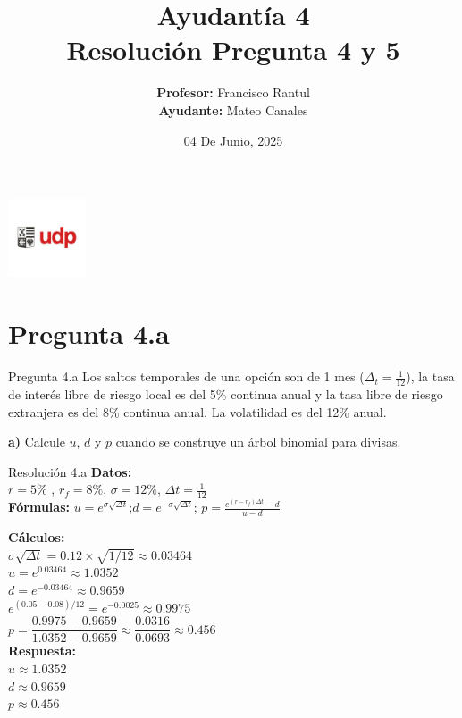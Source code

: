 \documentclass{beamer}
\title{Ayudantía 4 \\ Resolución Pregunta 4 y 5}
\author{
  \texorpdfstring{
    \textbf{Profesor:} Francisco Rantul \\[0.3em]
    \textbf{Ayudante:} Mateo Canales
  }{Profesor: Francisco Rantul, Ayudante: Mateo Canales}
}
\institute{Universidad Diego Portales}
\date{04 De Junio, 2025}
\begin{document}
\begin{frame}
    \titlepage
    \vfill
    \centering
    \includegraphics[width=2.3118cm]{../imagenes/logo.png}
\end{frame}

\section{Pregunta 4.a}
\begin{frame}{Pregunta 4.a}
  \justify
  Los saltos temporales de una opción son de 1 mes ($\Delta_t=\frac{1}{12}$), la tasa de interés libre de riesgo 
  local es del 5\% continua anual y la tasa libre de riesgo extranjera es del 8\% continua anual. 
  La volatilidad es del 12\% anual.

  \vspace{1em}
  \textbf{a)} Calcule $u$, $d$ y $p$ cuando se construye un árbol binomial para divisas.
\end{frame}

\begin{frame}{Resolución 4.a}
\justify
\textbf{Datos:} \\
$r=5\%$ , $r_f =8\%$, $\sigma=12\%$, $\Delta t = \frac{1}{12}$ \\

\vspace{0.5em}
\textbf{Fórmulas:}
$u = e^{\sigma \sqrt{\Delta t}}$;$d = e^{-\sigma \sqrt{\Delta t}}$; $p = \frac{e^{(r-r_f) \Delta t} - d}{u - d}$

\vspace{0.5em}
\textbf{Cálculos:} \\
$\sigma\sqrt{\Delta t} = 0.12 \times \sqrt{1/12} \approx 0.03464$ \\

$u = e^{0.03464} \approx 1.0352$ \\
$d = e^{-0.03464} \approx 0.9659$ \\

$e^{(0.05-0.08)/12} = e^{-0.0025} \approx 0.9975$ \\

$p = \dfrac{0.9975 - 0.9659}{1.0352 - 0.9659} \approx \dfrac{0.0316}{0.0693} \approx 0.456$ \\

\vspace{0.5em}
\textbf{Respuesta:} \\
$u \approx 1.0352$ \\
$d \approx 0.9659$ \\
$p \approx 0.456$ \\
\end{frame}
\end{document}
